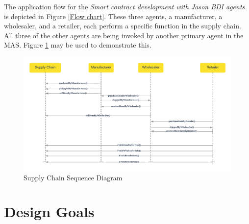 The application flow for the \textit{Smart contract development with Jason \ac{BDI} agents} is depicted in Figure  \ref{Flow chart}. These three agents, a manufacturer, a wholesaler, and a retailer, each perform a specific function in the supply chain. All three of the other agents are being invoked by another primary agent in the \ac{MAS}. Figure \ref{Sequence Diagram} may be used to demonstrate this.

   \begin{figure}[h]
    \centering
      \includegraphics[width=\linewidth]{includes/figures/Sequence diagram.png} 
      \caption{Supply Chain Sequence Diagram}
      \label{Sequence Diagram}
    \end{figure}

\section{Design Goals}

